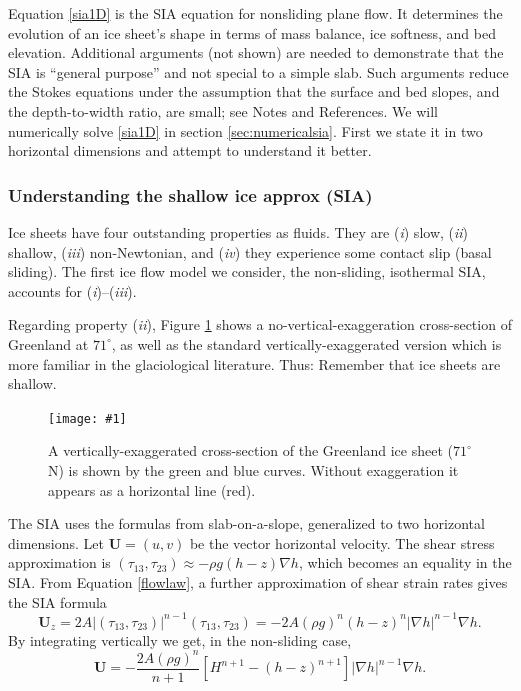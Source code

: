 \documentclass[titlepage,a4paper,final,12pt]{scrartcl}
\newcommand{\onefigsize}[3]{
\begin{figure}[ht]
\centering
\texttt{[image: \#1]}
\caption{#2}
\label{fig:#1}
\end{figure}}
\newcommand{\onefig}[2]{\onefigsize{#1}{#2}{3.0in}}
\begin{document}
Equation \eqref{sia1D} is the SIA equation for nonsliding plane flow.  It determines the evolution of an ice sheet's shape in terms of mass balance, ice softness, and bed elevation.  Additional arguments (not shown) are needed to demonstrate that the SIA is ``general purpose'' and not special to a simple slab.  Such arguments reduce the Stokes equations under the assumption that the surface and bed slopes, and the depth-to-width ratio, are small; see Notes and References.  We will numerically solve \eqref{sia1D} in section \ref{sec:numericalsia}.  First we state it in two horizontal dimensions and attempt to understand it better.

\subsubsection*{Understanding the shallow ice approx (SIA)}  Ice sheets have four outstanding properties as fluids.  They are (\emph{i}) slow, (\emph{ii}) shallow,  (\emph{iii}) non-Newtonian, and (\emph{iv}) they experience some contact slip (basal sliding).  The first ice flow model we consider, the non-sliding, isothermal SIA, accounts for (\emph{i})--(\emph{iii}).

Regarding property (\emph{ii}), Figure \ref{fig:green_transect} shows a no-vertical-exaggeration cross-section of Greenland at $71^\circ$, as well as the standard vertically-exaggerated version which is more familiar in the glaciological literature.  Thus: Remember that ice sheets are shallow.

\onefig{green_transect}{A vertically-exaggerated cross-section of the Greenland ice sheet ($71^\circ$ N) is shown by the green and blue curves.  Without exaggeration it appears as a horizontal line (red).}

The SIA uses the formulas from slab-on-a-slope, generalized to two horizontal dimensions.  Let $\mathbf{U} = (u,v)$ be the vector horizontal velocity.  The shear stress approximation is $(\tau_{13},\tau_{23}) \approx - \rho g (h-z) \nabla h$, which becomes an equality in the SIA.  From Equation \eqref{flowlaw}, a further approximation of shear strain rates gives the SIA formula
\begin{equation*}
\mathbf{U}_z = 2 A |(\tau_{13},\tau_{23})|^{n-1} (\tau_{13},\tau_{23}) = - 2 A (\rho g)^n (h-z)^n |\nabla h|^{n-1} \nabla h.
\end{equation*}
By integrating vertically we get, in the non-sliding case,
\begin{equation}
\mathbf{U} = - \frac{2 A (\rho g)^n}{n+1} \left[H^{n+1} - (h-z)^{n+1}\right] |\nabla h|^{n-1} \nabla h.  \label{siavelocity}
\end{equation}
\end{document}

